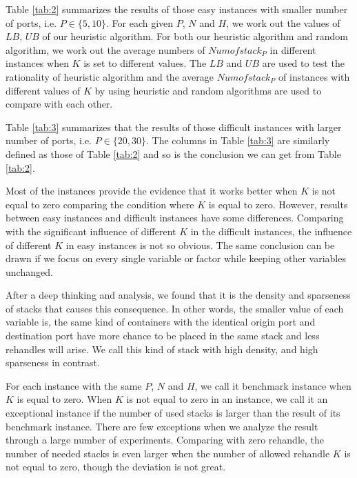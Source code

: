 \documentclass[review,3p,times,authoryear,12pt]{elsarticle}
\begin{document}
Table \ref{tab:2} summarizes the results of those easy instances with smaller number of ports, i.e. $P \in \{5, 10\}$.
For each given $P$, $N$ and $H$, we work out the values of $LB$, $UB$ of our heuristic algorithm.
For both our heuristic algorithm and random algorithm, we work out the average numbers of $Numofstack_P$ in different instances when $K$ is set to different values.
The $LB$ and $UB$ are used to test the rationality of heuristic algorithm and the average $Numofstack_P$ of instances with different values of $K$ by using heuristic and random algorithms are used to compare with each other.

Table \ref{tab:3} summarizes that the results of those difficult instances with larger number of ports, i.e. $P \in \{20, 30\}$.
The columns in Table \ref{tab:3} are similarly defined as those of Table \ref{tab:2} and so is the conclusion we can get from Table \ref{tab:2}.

Most of the instances provide the evidence that it works better when $K$ is not equal to zero comparing the condition where $K$ is equal to zero.
However, results between easy instances and difficult instances have some differences.
Comparing with the significant influence of different $K$ in the difficult instances, the influence of different $K$ in easy instances is not so obvious.
The same conclusion can be drawn if we focus on every single variable or factor while keeping other variables unchanged.

After a deep thinking and analysis, we found that it is the density and sparseness of stacks that causes this consequence.
In other words, the smaller value of each variable is, the same kind of containers with the identical origin port and destination port have more chance to be placed in the same stack and less rehandles will arise.
We call this kind of stack with high density, and high sparseness in contrast.

For each instance with the same $P$, $N$ and $H$, we call it benchmark instance when $K$ is equal to zero.
When $K$ is not equal to zero in an instance, we call it an exceptional instance if the number of used stacks is larger than the result of its benchmark instance.
There are few exceptions when we analyze the result through a large number of experiments.
Comparing with zero rehandle, the number of needed stacks is even larger when the number of allowed rehandle $K$ is not equal to zero, though the deviation is not great.
\end{document}
